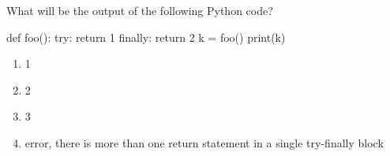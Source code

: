 \question
 What will be the output of the following Python code?

def foo():
    try:
        return 1
    finally:
        return 2
k = foo()
print(k)

\begin{enumerate}
\item 1
\item 2
\item 3
\item error, there is more than one return statement in a single try-finally block
\end{enumerate}

